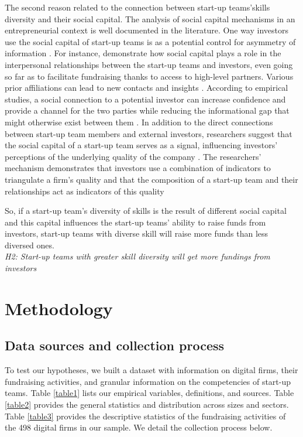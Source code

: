 \documentclass[12pt]{article}
\begin{document}
The second reason related to the connection between start-up teams'skills diversity and their social capital. The analysis of social capital mechanisms in an entrepreneurial context is well documented in the literature. One way investors use the social capital of start-up teams is as a potential control for asymmetry of information \citep{ko2018signaling}. For instance, \citet{shane2002network} demonstrate how social capital plays a role in the interpersonal relationships between the start-up teams and investors, even going so far as to facilitate fundraising thanks to access to high-level partners. Various prior affiliations can lead to new contacts and insights \citep{beckman2007early}. According to empirical studies, a social connection to a potential investor can increase confidence and provide a channel for the two parties while reducing the informational gap that might otherwise exist between them \citep{huang2017resources, shane2002network, shane2002organizational}. In addition to the direct connections between start-up team members and external investors, researchers suggest that the social capital of a start-up team serves as a signal, influencing investors' perceptions of the underlying quality of the company \citep{hoenig2015quality, shane2002organizational}. The researchers' mechanism demonstrates that investors use a combination of indicators to triangulate a firm's quality and that the composition of a start-up team and their relationships act as indicators of this quality \citep{plummer2016better, semrau2014exactly}

So, if a start-up team's diversity of skills is the result of different social capital and this capital influences the start-up teams' ability to raise funds from investors, start-up teams with diverse skill will raise more funds than less diversed ones. \\

\noindent \textit{H2: Start-up teams with greater skill diversity will get more fundings from investors}

\section{Methodology}

\subsection{Data sources and collection process}

To test our hypotheses, we built a dataset with information on digital firms, their fundraising activities, and granular information on the competencies of start-up teams. Table \ref{table1} lists our empirical variables, definitions, and sources. Table \ref{table2} provides the general statistics and distribution across sizes and sectors. Table \ref{table3} provides the descriptive statistics of the fundraising activities of the 498 digital firms in our sample. We detail the collection process below. \\
\end{document}

